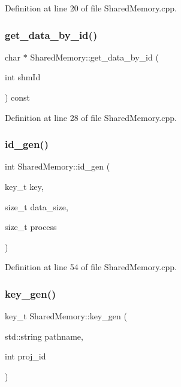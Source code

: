 Definition at line 20 of file Shared\+Memory.\+cpp.

\mbox{\label{class_shared_memory_a209fcce32c646bd4ad4e2492004b32c5}} 
\subsubsection{\texorpdfstring{get\+\_\+data\+\_\+by\+\_\+id()}{get\_data\_by\_id()}}
{\footnotesize\ttfamily char $\ast$ Shared\+Memory\+::get\+\_\+data\+\_\+by\+\_\+id (\begin{DoxyParamCaption}\item[{int}]{shm\+Id }\end{DoxyParamCaption}) const}



Definition at line 28 of file Shared\+Memory.\+cpp.

\mbox{\label{class_shared_memory_af171de2b17ae37c2e19a0980000d2f60}} 
\subsubsection{\texorpdfstring{id\+\_\+gen()}{id\_gen()}}
{\footnotesize\ttfamily int Shared\+Memory\+::id\+\_\+gen (\begin{DoxyParamCaption}\item[{key\+\_\+t}]{key,  }\item[{size\+\_\+t}]{data\+\_\+size,  }\item[{size\+\_\+t}]{process }\end{DoxyParamCaption})\hspace{0.3cm}{\ttfamily [static]}}



Definition at line 54 of file Shared\+Memory.\+cpp.

\mbox{\label{class_shared_memory_a05547eb8707ee646607334893b4196c3}} 
\subsubsection{\texorpdfstring{key\+\_\+gen()}{key\_gen()}}
{\footnotesize\ttfamily key\+\_\+t Shared\+Memory\+::key\+\_\+gen (\begin{DoxyParamCaption}\item[{std\+::string}]{pathname,  }\item[{int}]{proj\+\_\+id }\end{DoxyParamCaption})\hspace{0.3cm}{\ttfamily [static]}}



